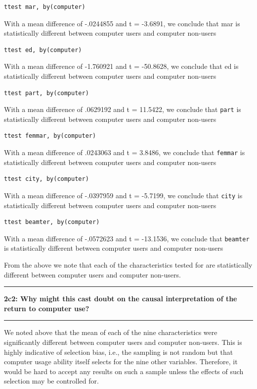 \documentclass[12pt]{article}
\newcommand\question[2]{\vspace{1em}\hrule\vspace{1em}\textbf{#1: #2}\vspace{1em}\hrule\vspace{1em}}
\begin{document}
\begin{lstlisting}
ttest mar, by(computer)
\end{lstlisting}
With a mean difference of -.0244855  and t =  -3.6891, we conclude that mar is statistically different between computer users and computer non-users

\begin{lstlisting}
ttest ed, by(computer)
\end{lstlisting}
With a mean difference of -1.760921  and t = -50.8628, we conclude that ed is statistically different between computer users and computer non-users

\begin{lstlisting}
ttest part, by(computer)
\end{lstlisting}
With a mean difference of .0629192  and t =  11.5422, we conclude that \verb|part| is statistically different between computer users and computer non-users

\begin{lstlisting}
ttest femmar, by(computer)
\end{lstlisting}
With a mean difference of .0243063 and t =  3.8486, we conclude that \verb|femmar| is statistically different between computer users and computer non-users

\begin{lstlisting}
ttest city, by(computer)
\end{lstlisting}
With a mean difference of -.0397959  and t = -5.7199, we conclude that \verb|city| is statistically different between computer users and computer non-users

\begin{lstlisting}
ttest beamter, by(computer)
\end{lstlisting}
With a mean difference of -.0572623  and t =  -13.1536, we conclude that \verb|beamter| is statistically different between computer users and computer non-users

From the above we note that each of the characteristics tested for are statistically different between computer users and computer non-users.

\question{2c2}{Why might this cast doubt on the causal interpretation of the return to computer use?  }
We noted above that the mean of each of the nine characteristics were significantly different between computer users and computer non-users. This is highly indicative of selection bias, i.e., the sampling is not random but that computer usage ability itself selects for the nine other variables. Therefore, it would be hard to accept any results on such a sample unless the effects of such selection may be controlled for.
\end{document}
